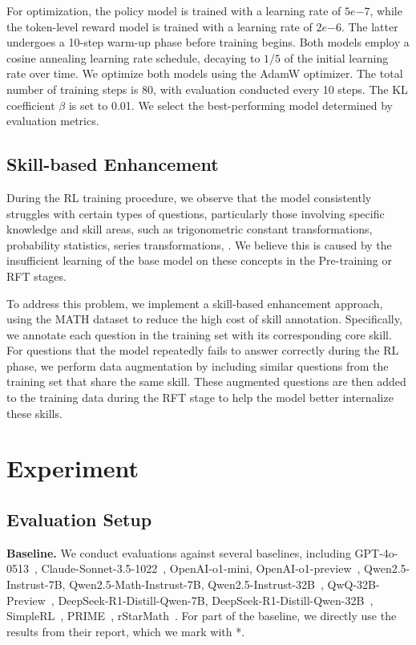 For optimization, the policy model is trained with a learning rate of $5e{-7}$, while the token-level reward model is trained with a learning rate of $2e{-6}$. The latter undergoes a 10-step warm-up phase before training begins. Both models employ a cosine annealing learning rate schedule, decaying to $1/5$ of the initial learning rate over time. We optimize both models using the AdamW optimizer. The total number of training steps is 80, with evaluation conducted every 10 steps. The KL coefficient $\beta$ is set to 0.01. We select the best-performing model determined by evaluation metrics.


\subsection{Skill-based Enhancement}
\label{subsec:skill-enhance}

During the RL training procedure, we observe that the model consistently struggles with certain types of questions, particularly those involving specific knowledge and skill areas, such as trigonometric constant transformations, probability statistics, series transformations, \etc. We believe this is caused by the insufficient learning of the base model on these concepts in the Pre-training or RFT stages.

To address this problem, we implement a skill-based enhancement approach, using the MATH dataset to reduce the high cost of skill annotation. Specifically, we annotate each question in the training set with its corresponding core skill. For questions that the model repeatedly fails to answer correctly during the RL phase, we perform data augmentation by including similar questions from the training set that share the same skill. These augmented questions are then added to the training data during the RFT stage to help the model better internalize these skills.

\section{Experiment}
\label{sec:experiment}



\subsection{Evaluation Setup}

\noindent\textbf{Baseline.}
We conduct evaluations against several baselines, including GPT-4o-0513~\cite{gpt4o}, Claude-Sonnet-3.5-1022~\cite{claude35sonnet}, OpenAI-o1-mini, OpenAI-o1-preview~\cite{openai2024learning}, Qwen2.5-Instrust-7B, Qwen2.5-Math-Instrust-7B, Qwen2.5-Instrust-32B~\cite{yang2024qwen2}, QwQ-32B-Preview~\cite{qwq-32b-preview}, DeepSeek-R1-Distill-Qwen-7B, DeepSeek-R1-Distill-Qwen-32B~\cite{deepseekr1}, SimpleRL~\cite{zeng2025simplerl}, PRIME~\cite{cui2025process}, rStarMath~\cite{guan2025rstar}.
For part of the baseline, we directly use the results from their report, which we mark with *.


